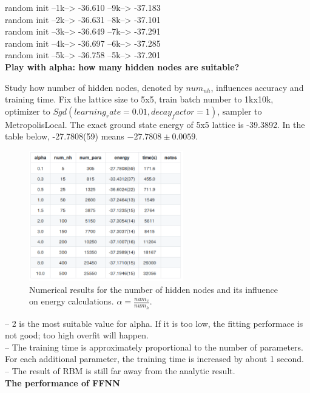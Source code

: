 \documentclass{article}
\begin{document}
random init --1k--> -36.610 --9k--> -37.183 \\
random init --2k--> -36.631 --8k--> -37.101 \\
random init --3k--> -36.649 --7k--> -37.291 \\
random init --4k--> -36.697 --6k--> -37.285 \\
random init --5k--> -36.758 --5k--> -37.201 \\

\textbf{Play with alpha: how many hidden nodes are suitable?}

Study how number of hidden nodes, denoted by $num_{nh}$, influences accuracy and training time. Fix the lattice size to 5x5, train batch number to 1kx10k, optimizer to \texttt{$Sgd(learning_rate=0.01,decay_factor=1)$}, sampler to MetropolisLocal. The exact ground state energy of 5x5 lattice is -39.3892. In the table below, -27.7808(59) means $-27.7808\pm0.0059$. \\

\begin{figure}[!htb]
	\centering
	\includegraphics[width=0.6\textwidth]{./images/alpha.png}
	\caption{\label{tab:alpha} Numerical results for the number of hidden nodes and its influence on energy calculations. $\alpha = \frac{num_{v}}{num_{h}}$.} 
\end{figure}

    -- 2 is the most suitable value for alpha. If it is too low, the fitting performace is not good; too high overfit will happen. \\
    -- The training time is approximately proportional to the number of parameters. For each additional parameter, the training time is increased by about 1 second. \\
    -- The result of RBM is still far away from the analytic result. \\

\textbf{The performance of FFNN}
\end{document}
